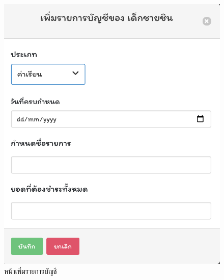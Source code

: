       \begin{figure}
        \begin{center}
        \includegraphics[scale=0.5]{images/CreatePayment.png}
        \end{center}
        \caption[หน้าเพิ่มรายการบัญชี]{หน้าเพิ่มรายการบัญชี}
        \label{fig:CreatePayment}
        \end{figure}
    
